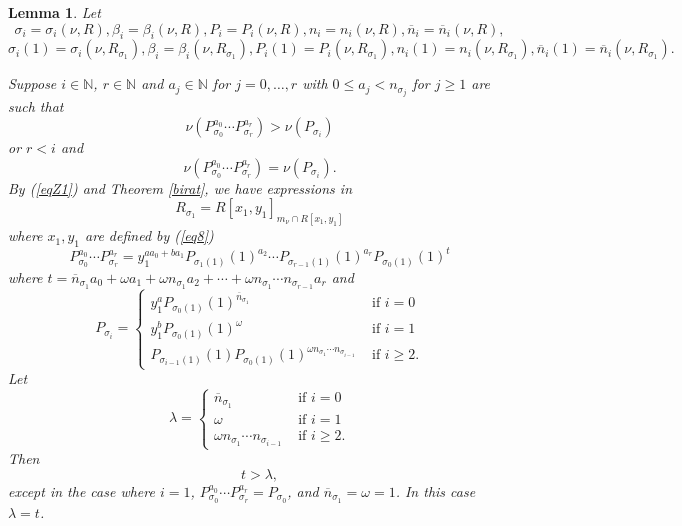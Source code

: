 \documentclass[11pt]{amsart}
\def\NZQ{\mathbb}               %
\def\NN{{\NZQ N}}
\newtheorem{Lemma}[Theorem]{Lemma}
\begin{document}
\begin{Lemma}\label{Lemma1} Let
$$
\sigma_i=\sigma_i(\nu,R), \beta_i=\beta_i(\nu,R), P_{i}=P_i(\nu,R), n_i=n_i(\nu,R), \overline n_i=\overline n_i(\nu,R),
$$
$$
\sigma_i(1)=\sigma_i(\nu,R_{\sigma_1}), \beta_i=\beta_i(\nu,R_{\sigma_1}), P_i(1)=P_i(\nu,R_{\sigma_1}), n_i(1)=n_i(\nu,R_{\sigma_1}), \overline n_i(1)=\overline n_i(\nu,R_{\sigma_1}).
$$

Suppose $i\in \NN$, $r\in \NN$  and $a_j\in \NN$ for $j=0,\ldots, r$ with $0\le a_j<n_{\sigma_j}$ for $j\ge 1$ are such that 
$$
\nu(P_{\sigma_0}^{a_0}\cdots P_{\sigma_r}^{a_r})> \nu(P_{\sigma_i})
$$
 or $r<i$ and 
 $$
 \nu(P_{\sigma_0}^{a_0}\cdots P_{\sigma_r}^{a_r})= \nu(P_{\sigma_i}).
 $$
 By (\ref{eqZ1}) and Theorem \ref{birat}, we have expressions in 
 $$
 R_{\sigma_1}=R[x_1,y_1]_{m_{\nu}\cap R[x_1,y_1]}
 $$
 where $x_1,y_1$ are defined by (\ref{eq8})
$$
P_{\sigma_0}^{a_0}\cdots P_{\sigma_r}^{a_r}=y_1^{aa_0+ba_1}P_{\sigma_1(1)}(1)^{a_2}\cdots P_{
\sigma_{r-1}(1)}(1)^{a_r}P_{\sigma_0(1)}(1)^t
$$
where $t=\overline n_{\sigma_1}a_0+\omega a_1+\omega n_{\sigma_1}a_2+\cdots+\omega n_{\sigma_1}\cdots n_{\sigma_{r-1}}a_r$ and 
$$
P_{\sigma_i}=
\left\{
\begin{array}{ll}
y_1^aP_{\sigma_0(1)}(1)^{\overline n_{\sigma_1}}&\mbox{ if }i=0\\
y_1^bP_{\sigma_0(1)}(1)^{\omega}&\mbox{ if }i=1\\
P_{\sigma_{i-1}(1)}(1)P_{\sigma_0(1)}(1)^{\omega n_{\sigma_1}\cdots n_{\sigma_{i-1}}}&\mbox{ if }i\ge 2.
\end{array}\right.
$$
Let 
$$
\lambda=\left\{\begin{array}{ll}
\overline n_{\sigma_1}&\mbox{ if }i=0\\
\omega&\mbox{ if }i=1\\
\omega n_{\sigma_1}\cdots n_{\sigma_{i-1}}&\mbox{ if }i\ge 2.
\end{array}\right.
$$
Then 
$$
t>\lambda,
$$
except  in the case where $i=1$, $P_{\sigma_0}^{a_0}\cdots P_{\sigma_r}^{a_r}=P_{\sigma_0}$, and $\overline n_{\sigma_1}=\omega=1$.
In this  case $\lambda=t$. 
\end{Lemma}
\end{document}

